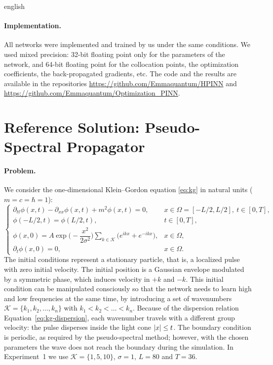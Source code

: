 \documentclass[0000.tex]{subfiles}
\begin{document}
\begin{hyphenrules}{english}
\paragraph{Implementation.}
All networks were implemented and trained by us under the same conditions. We used mixed precision:
32-bit floating point only for the parameters of the network, and 64-bit floating point for the
collocation points, the optimization coefficients, the back-propagated gradients, etc. The code and the
results are available in the repositories
\url{https://github.com/Emmaquantum/HPINN} and \url{https://github.com/Emmaquantum/Optimization_PINN}.

\section{Reference Solution: Pseudo-Spectral Propagator}\label{sec:reference-solution}

\paragraph{Problem.}
We consider the one-dimensional Klein--Gordon equation \eqref{eq:kg} in natural units ($m=c=\hbar=1$):
\begin{equation}
  \begin{cases}
    \partial_{tt}\phi(x,t)-\partial_{xx}\phi(x,t)+m^2\phi(x,t)=0, & x\in\Omega=[-L/2,L/2],\ t\in[0,T],\\
    \phi(-L/2,t)=\phi(L/2,t), & t\in[0,T],\\
    \phi(x,0)=A\exp\Big(-\dfrac{x^2}{2\sigma^2}\Big)\displaystyle\sum_{k\in\mathcal{K}}\big(e^{ikx}+e^{-ikx}\big), & x\in\Omega,\\
    \partial_t\phi(x,0)=0, & x\in\Omega.
  \end{cases}
  \label{eq:kg-problem}
\end{equation}
The initial conditions represent a stationary particle, that is, a localized pulse with zero initial
velocity. The initial position is a Gaussian envelope modulated by a symmetric phase, which induces
velocity in $+k$ and $-k$. This initial condition can be manipulated consciously so that the network
needs to learn high and low frequencies at the same time, by introducing a set of wavenumbers
$\mathcal{K}=\{k_1,k_2,\dots,k_n\}$ with $k_1<k_2<\dots<k_n$. Because of the dispersion relation
Equation~\eqref{eq:kg-dispersion}, each wavenumber travels with a different group velocity: the pulse disperses
inside the light cone $\left\lvert x \right\rvert\le t$. The boundary condition is periodic, as required by the
pseudo-spectral method; however, with the chosen parameters the wave does not reach the boundary during
the simulation. In Experiment~1 we use $\mathcal{K}=\{1,5,10\}$, $\sigma=1$, $L=80$ and $T=36$.


\end{hyphenrules}
\end{document}
